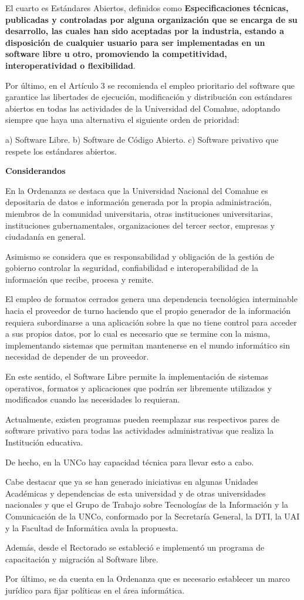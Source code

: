 {El cuarto es Estándares Abiertos, definidos como \textbf{Especificaciones técnicas, publicadas y controladas por alguna organización que se encarga de su desarrollo, las cuales han sido aceptadas por la industria, estando a disposición de cualquier usuario para ser implementadas en un software libre u otro, promoviendo la competitividad, interoperatividad o flexibilidad}. 

Por último, en el Artículo 3 se recomienda el empleo prioritario del software que garantice las libertades de ejecución, modificación y distribución con estándares abiertos en todas las actividades de la Universidad del Comahue, adoptando siempre que haya una alternativa el siguiente orden de prioridad:

a) Software Libre.
b) Software de Código Abierto.
c) Software privativo que respete los estándares abiertos.


\textbf{Considerandos}

En la Ordenanza se destaca que la Universidad Nacional del Comahue es depositaria de datos e información generada por la propia administración, miembros de la comunidad universitaria, otras instituciones universitarias, instituciones gubernamentales, organizaciones del tercer sector, empresas y ciudadanía en general.

Asimismo se considera que es responsabilidad y obligación de la gestión de gobierno controlar la seguridad, confiabilidad e interoperabilidad de la información que recibe, procesa y remite.

El empleo de formatos cerrados genera una dependencia tecnológica interminable hacia el proveedor de turno haciendo que el propio generador de la información requiera subordinarse a una aplicación sobre la que no tiene control para acceder a sus propios datos, por lo cual es necesario que se termine con la misma, implementando sistemas que permitan mantenerse en el mundo informático sin necesidad de depender de un proveedor.

En este sentido, el Software Libre permite la implementación de sistemas operativos, formatos y aplicaciones que podrán ser libremente utilizados y modificados cuando las necesidades lo requieran.

Actualmente, existen programas  pueden reemplazar sus respectivos pares de software privativo para todas las actividades administrativas que realiza la Institución educativa.

De hecho, en la UNCo hay capacidad técnica para llevar esto a cabo.

Cabe destacar que ya se han generado iniciativas en algunas Unidades Académicas y dependencias de esta universidad y de otras universidades nacionales y que el Grupo de Trabajo sobre Tecnologías de la Información y la Comunicación de la UNCo, conformado por la Secretaría General, la DTI, la UAI y la Facultad de Informática avala la propuesta.

Además, desde el Rectorado se estableció e implementó un programa de capacitación y migración al Software libre.

Por último, se da cuenta en la Ordenanza que es necesario establecer un marco jurídico para fijar políticas en el área informática.

}

